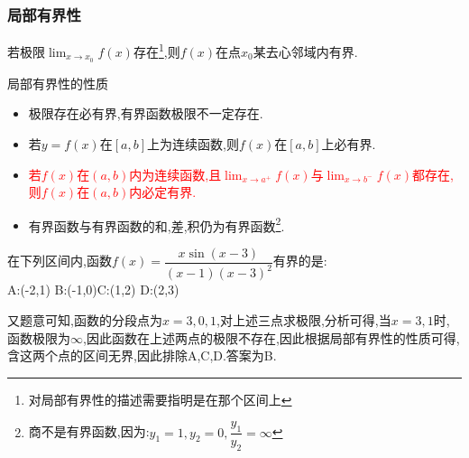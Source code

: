 \documentclass[8pt a4paper, oneside, UTF8]{ctexbook}
\begin{document}
\begin{sloppypar}
    \subsubsection{局部有界性}
    \begin{them}{}{}
        若极限$\lim_{x \to x_0}f(x)$存在\footnote{对局部有界性的描述需要指明是在那个区间上},则$f(x)$在点$x_0$某去心邻域内有界.
    \end{them}
    \begin{criterion}{局部有界性的性质}{}
        \begin{itemize}
            \item 极限存在必有界,有界函数极限不一定存在.
            \item 若$y=f(x)$在$[a,b]$上为连续函数,则$f(x)$在$[a,b]$上必有界.
            \item \textcolor{red}{若$f(x)$在$(a,b)$内为连续函数,且$\lim_{x \to a^+}f(x)$与$\lim_{x\to b^-}f(x)$都存在,则$f(x)$在$(a,b)$内必定有界.}
            \item 有界函数与有界函数的和,差,积仍为有界函数\footnote{商不是有界函数,因为:$y_1=1,y_2=0,\dfrac{y_1}{y_2}=\infty$}.
        \end{itemize}
    \end{criterion}
    \begin{problem}
    在下列区间内,函数$f(x)={\dfrac{x\sin(x-3)}{(x-1)(x-3)^{2}}}$有界的是:\\
    A:(-2,1) \qquad  B:(-1,0)\qquad C:(1,2) \qquad D:(2,3)
    \end{problem}
    \begin{solution}
        又题意可知,函数的分段点为$x=3,0,1$,对上述三点求极限,分析可得,当$x=3,1$时,函数极限为$\infty$,因此函数在上述两点的极限不存在,因此根据局部有界性的性质可得,含这两个点的区间无界,因此排除A,C,D.答案为B.
    \end{solution}

\end{sloppypar}
\end{document}
